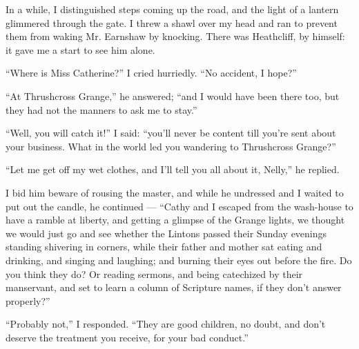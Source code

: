 \par In a while, I distinguished steps coming up the road, and the light of a lantern glimmered through the gate. I threw a shawl over my head and ran to prevent them from waking Mr. Earnshaw by knocking. There was Heathcliff, by himself: it gave me a start to see him alone.
\par “Where is Miss Catherine?” I cried hurriedly. “No accident, I hope?”
\par “At Thrushcross Grange,” he answered; “and I would have been there too, but they had not the manners to ask me to stay.”
\par “Well, you will catch it!” I said: “you'll never be content till you're sent about your business. What in the world led you wandering to Thrushcross Grange?”
\par “Let me get off my wet clothes, and I'll tell you all about it, Nelly,” he replied.
\par I bid him beware of rousing the master, and while he undressed and I waited to put out the candle, he continued — “Cathy and I escaped from the wash-house to have a ramble at liberty, and getting a glimpse of the Grange lights, we thought we would just go and see whether the Lintons passed their Sunday evenings standing shivering in corners, while their father and mother sat eating and drinking, and singing and laughing; and burning their eyes out before the fire. Do you think they do? Or reading sermons, and being catechized by their manservant, and set to learn a column of Scripture names, if they don't answer properly?”
\par “Probably not,” I responded. “They are good children, no doubt, and don't deserve the treatment you receive, for your bad conduct.”
